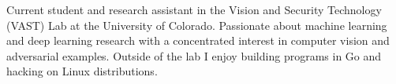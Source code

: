 

\begin{cvparagraph}

Current student and research assistant in the Vision and Security Technology (VAST) Lab at the University of Colorado. Passionate about machine learning and deep learning research with a concentrated interest in computer vision and adversarial examples. Outside of the lab I enjoy building programs in Go and hacking on Linux distributions. 
\end{cvparagraph}
